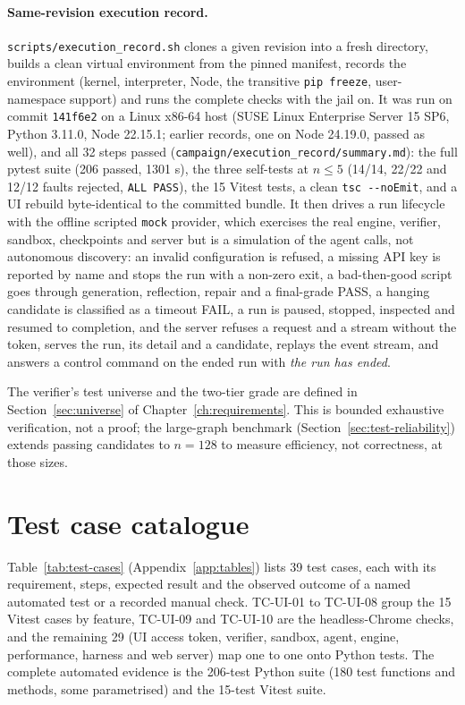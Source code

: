 \paragraph{Same-revision execution record.} \texttt{scripts/execution\_record.sh}
clones a given revision into a fresh directory, builds a clean virtual environment
from the pinned manifest, records the environment (kernel, interpreter, Node, the
transitive \texttt{pip freeze}, user-namespace support) and runs the complete
checks with the jail on. It was run on commit \texttt{141f6e2} on a Linux x86-64
host (SUSE Linux Enterprise Server 15 SP6, Python 3.11.0, Node 22.15.1; earlier
records, one on Node 24.19.0, passed as well), and all 32 steps passed
(\texttt{campaign/execution\_record/summary.md}): the full pytest suite (206
passed, 1301 s), the three self-tests at $n \le 5$ (14/14, 22/22 and 12/12 faults
rejected, \texttt{ALL PASS}), the 15 Vitest tests, a clean
\texttt{tsc -{}-noEmit}, and a UI rebuild byte-identical to the committed bundle.
It then drives a run lifecycle with the offline scripted \texttt{mock} provider,
which exercises the real engine, verifier, sandbox, checkpoints and server but is
a simulation of the agent calls, not autonomous discovery: an invalid
configuration is refused, a missing API key is reported by name and stops the
run with a non-zero exit, a bad-then-good
script goes through generation, reflection, repair and a final-grade PASS, a
hanging candidate is classified as a timeout FAIL, a run is paused, stopped,
inspected and resumed to completion, and the server refuses a request and a
stream without the token, serves the run, its detail and a candidate, replays the
event stream, and answers a control command on the ended run with \emph{the run
has ended}.

The verifier's test universe and the two-tier grade are defined in
Section~\ref{sec:universe} of Chapter~\ref{ch:requirements}. This is bounded
exhaustive verification, not a proof; the large-graph benchmark
(Section~\ref{sec:test-reliability}) extends passing candidates to $n = 128$
to measure efficiency, not correctness, at those sizes.

\section{Test case catalogue}
\label{sec:test-cases}

Table~\ref{tab:test-cases} (Appendix~\ref{app:tables}) lists 39 test cases,
each with its requirement, steps, expected result and the observed outcome of a
named automated test or a recorded manual check. TC-UI-01 to TC-UI-08 group the
15 Vitest cases by feature, TC-UI-09 and TC-UI-10 are the headless-Chrome checks,
and the remaining 29 (UI access token, verifier, sandbox, agent, engine, performance, harness and
web server) map one to one onto Python tests. The complete automated evidence is
the 206-test Python suite (180 test functions and methods, some parametrised)
and the 15-test Vitest suite.

